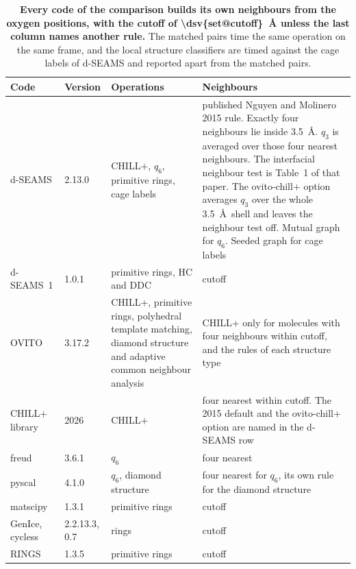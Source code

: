 \documentclass[preprint,12pt]{elsarticle}
\begin{document}
\begin{table}[tbp]
\centering
\caption{\textbf{Every code of the comparison builds its own neighbours from the oxygen positions, with the cutoff of \qty{\dsv{set@cutoff}}{\angstrom} unless the last column names another rule.}
The matched pairs time the same operation on the same frame, and the local structure classifiers are timed against the cage labels of d-SEAMS and reported apart from the matched pairs.}
\label{tab:codes}
\small
\setlength{\tabcolsep}{4pt}
\begin{tabularx}{\linewidth}{@{}ll>{\raggedright\arraybackslash}X>{\raggedright\arraybackslash}X@{}}
\toprule
Code & Version & Operations & Neighbours \\
\midrule
d-SEAMS & 2.13.0 & CHILL+, $q_6$, primitive rings, cage labels &
published Nguyen and Molinero 2015 rule.
Exactly four neighbours lie inside 3.5~\AA.
$q_3$ is averaged over those four nearest neighbours.
The interfacial neighbour test is Table~1 of that paper.
The ovito-chill+ option averages $q_3$ over the whole 3.5~\AA\ shell and
leaves the neighbour test off.
Mutual graph for $q_6$.
Seeded graph for cage labels \\
d-SEAMS~1 & 1.0.1 & primitive rings, HC and DDC & cutoff \\
OVITO~\cite{ovito3172} & 3.17.2 & CHILL+, primitive rings, polyhedral template matching, diamond structure and adaptive common neighbour analysis & CHILL+ only for molecules with four neighbours within cutoff, and the rules of each structure type \\
CHILL+ library~\cite{palmer2026orderparams} & 2026 & CHILL+ &
four nearest within cutoff.
The 2015 default and the ovito-chill+ option are named in the d-SEAMS
row \\
freud~\cite{ramasubramani2020freud} & 3.6.1 & $q_6$ & four nearest \\
pyscal~\cite{menon2019pyscal} & 4.1.0 & $q_6$, diamond structure & four nearest for $q_6$, its own rule for the diamond structure \\
matscipy~\cite{grigorev2024matscipy} & 1.3.1 & primitive rings & cutoff \\
GenIce, cycless~\cite{matsumoto2018genice,matsumoto2026cycless} & 2.2.13.3, 0.7 & rings & cutoff \\
RINGS~\cite{leroux2010rings} & 1.3.5 & primitive rings & cutoff \\
\bottomrule
\end{tabularx}
\end{table}
\end{document}
